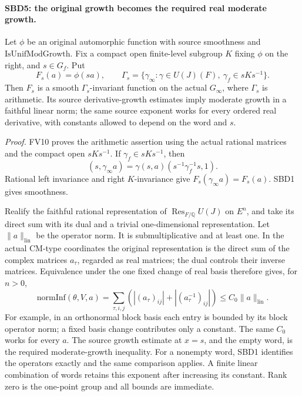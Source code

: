 \documentclass[11pt,a4paper]{article}
\numberwithin{equation}{section}
\theoremstyle{remark}\newtheorem{remark}[theorem]{Remark}
\begin{document}
\paragraph{SBD5: the original growth becomes the required real moderate growth.}
\label{claim:SBD5}
Let \(\phi\) be an original automorphic function with source
smoothness and \(\mathrm{IsUnifModGrowth}\).  Fix a compact open
finite-level subgroup \(K\) fixing \(\phi\) on the right, and
\(s\in G_f\).  Put
\[
 F_s(a)=\phi(sa),\qquad
 \Gamma_s=\{\gamma_\infty:\gamma\in U(J)(F),\
                         \gamma_f\in sKs^{-1}\}.
 \tag{SBD.9}
\]
Then \(F_s\) is a smooth \(\Gamma_s\)-invariant function on the
actual \(G_\infty\), where \(\Gamma_s\) is arithmetic.  Its
source derivative-growth estimates imply moderate growth in a
faithful linear norm; the same source exponent works for every
ordered real derivative, with constants allowed to depend on
the word and \(s\).

\emph{Proof.}
FV10 proves the arithmetic assertion using the actual rational
matrices and the compact open \(sKs^{-1}\).  If
\(\gamma_f\in sKs^{-1}\), then
\[
 (s,\gamma_\infty a)=\gamma(s,a)
                  (s^{-1}\gamma_f^{-1}s,1).
\]
Rational left invariance and right \(K\)-invariance give
\(F_s(\gamma_\infty a)=F_s(a)\).  SBD1 gives smoothness.

Realify the faithful rational representation of
\(\operatorname{Res}_{F/\mathbb Q}U(J)\) on \(E^n\), and take
its direct sum with its dual and a trivial one-dimensional
representation.  Let \(\|a\|_{\mathrm{lin}}\) be the operator
norm.  It is submultiplicative and at least one.  In the actual
CM-type coordinates the original representation is the direct
sum of the complex matrices \(a_\tau\), regarded as real matrices;
the dual controls their inverse matrices.  Equivalence under the
one fixed change of real basis therefore gives, for \(n>0\),
\[
 \mathrm{normInf}(\theta,V,a)
   =\sum_{\tau,i,j}(|(a_\tau)_{ij}|+|(a_\tau^{-1})_{ij}|)
   \le C_0\|a\|_{\mathrm{lin}}.
 \tag{SBD.10}
\]
For example, in an orthonormal block basis each entry is bounded
by its block operator norm; a fixed basis change contributes only
a constant.  The same \(C_0\) works for every \(a\).
The source growth estimate at \(x=s\), and the empty word, is
the required moderate-growth inequality.  For a nonempty word,
SBD1 identifies the operators exactly and the same comparison
applies.  A finite linear combination of words retains this
exponent after increasing its constant.  Rank zero is the
one-point group and all bounds are immediate.
\end{document}
